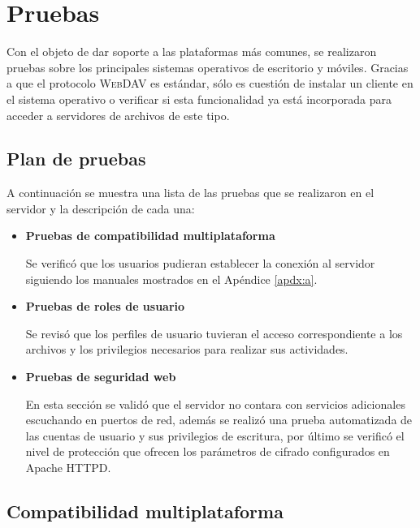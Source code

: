 {
  \linespread{1}
  \cleardoublepage  
  \chapter{Pruebas}
  \label{chap:cap4}
}

Con el objeto de dar soporte a las plataformas m\'{a}s comunes, se realizaron pruebas sobre los principales sistemas operativos de escritorio y m\'{o}viles. Gracias a que el protocolo \textsc{WebDAV} es est\'{a}ndar, s\'{o}lo es cuesti\'{o}n de instalar un cliente en el sistema operativo o verificar si esta funcionalidad ya est\'{a} incorporada para acceder a servidores de archivos de este tipo.

    \section {Plan de pruebas}

A continuaci\'{o}n se muestra una lista de las pruebas que se realizaron en el servidor y la descripci\'{o}n de cada una:

\begin{itemize}

  \item \textbf{Pruebas de compatibilidad multiplataforma}

Se verific\'{o} que los usuarios pudieran establecer la conexi\'{o}n al servidor siguiendo los manuales mostrados en el \textup{Ap\'{e}ndice \ref{apdx:a}}.

  \item \textbf{Pruebas de roles de usuario}

Se revis\'{o} que los perfiles de usuario tuvieran el acceso correspondiente a los archivos y los privilegios necesarios para realizar sus actividades.

  \item \textbf{Pruebas de seguridad web}

En esta secci\'{o}n se valid\'{o} que el servidor no contara con servicios adicionales escuchando en puertos de red, adem\'{a}s se realiz\'{o} una prueba automatizada de las cuentas de usuario y sus privilegios de escritura, por \'{u}ltimo se verific\'{o} el nivel de protecci\'{o}n que ofrecen los par\'{a}metros de cifrado configurados en Apache \textsc{HTTPD}.

\end{itemize}

\newpage
    \section {Compatibilidad multiplataforma}

